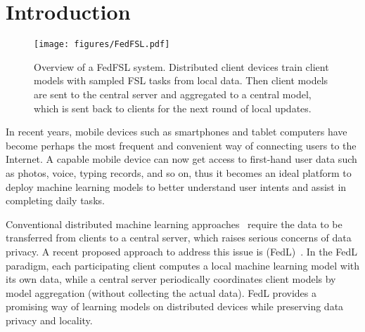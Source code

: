 \section{Introduction}


\begin{figure}
\begin{center}
\texttt{[image: figures/FedFSL.pdf]}
\end{center}
\vspace{-10pt}
\caption{Overview of a FedFSL system. Distributed client devices train client models with sampled FSL tasks from local data. Then client models are sent to the central server and aggregated to a central model, which is sent back to clients for the next round of local updates.
}\label{fig:fl_fsl_demo}
\vspace{-10pt}
\end{figure}


In recent years, mobile devices such as smartphones and tablet computers have become perhaps the most frequent and convenient way of connecting users to the Internet. A capable mobile device can now get access to first-hand user data such as photos, voice, typing records, and so on, thus it becomes an ideal platform to deploy machine learning models to better understand user intents and assist in completing daily tasks.


Conventional distributed machine learning approaches~\cite{li2014scaling, zhang2015deep} require the data to be transferred from clients to a central server, which raises serious concerns of data privacy.
A recent proposed approach to address this issue is \fdl (FedL)~\cite{fedavg,zhao2018federated,li2020federated}. In the FedL paradigm, each participating client computes a local machine learning model with its own data, while a central server periodically coordinates client models by model aggregation (without collecting the actual data). FedL provides a promising way of learning models on distributed devices while preserving data privacy and locality. 



